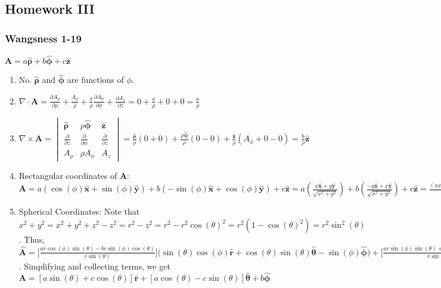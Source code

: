 \documentclass[oneside]{book}
\theoremstyle{definition}
\newcommand*\B[1]{\mathbf{#1}}
\newcommand*\Bh[1]{\mathbf{\hat{#1}}}
\begin{document}
\subsection*{Homework III}

\subsubsection{Wangsness 1-19}
$\B{A} = a\B{\hat{\rho}} + b\B{\hat{\phi}}+c\B{\hat{z}}$
\begin{enumerate}
\item No. $\Bh{\rho}$ and $\Bh{\phi}$ are functions of $\phi$.
\item $\nabla \cdot \B{A} = \frac{\partial A_{\rho}}{\partial \rho} + \frac{A_{\rho}}{\rho} + \frac{1}{\rho}\frac{\partial A_{\phi}}{\partial \phi} + \frac{\partial A_{z}}{\partial z} = 0+\frac{a}{\rho}+0+0 = \frac{a}{\rho}$
\item $\nabla \times \B{A} = \begin{vmatrix} \Bh{\rho} & \rho \Bh{\phi} & \Bh{z} \\ \frac{\partial}{\partial z} & \frac{\partial}{\partial \phi} & \frac{\partial}{\partial z} \\ A_{\rho} & \rho A_{\phi} & A_z \end{vmatrix} = \frac{\Bh{\rho}}{\rho}(0+0)+\frac{\rho \Bh{\phi}}{\rho}(0-0) + \frac{\Bh{z}}{\rho}(A_\phi +0-0) = \frac{b}{\rho}\Bh{z}$
\item Rectangular coordinates of $\B{A}$: $\B{A} = a(\cos(\phi)\Bh{x}+\sin(\phi)\Bh{y})+b(-\sin(\phi)\Bh{x}+\cos(\phi)\Bh{y})+c\Bh{z} = a(\frac{x\Bh{x}+y\Bh{y}}{\sqrt{x^2+y^2}})+b(\frac{-y\Bh{x}+x\Bh{y}}{\sqrt{x^2+y^2}})+c\Bh{z} = \frac{(ax-by)\Bh{x}+(ay+bx)\Bh{y}}{\sqrt{x^2+y^2}}+c\Bh{z}$
\item Spherical Coordinates: Note that $x^2+y^2 = x^2+y^2+z^2-z^2=r^2-z^2=r^2-r^2\cos(\theta)^2=r^2(1-\cos(\theta)^2)=r^2\sin^2(\theta)$. Thus, $\Bh{A} = \big[\frac{ar\cos(\phi)\sin(\theta)-br\sin(\phi)\cos(\theta)}{r\sin(\theta)}\big]\big(\sin(\theta)\cos(\phi)\Bh{r}+\cos(\theta)\sin(\theta)\Bh{\theta}-\sin(\phi)\Bh{\phi}\big) + \big[\frac{ar\sin(\phi)\sin(\theta)+br\cos(\phi)\sin(\theta)}{r\sin(\theta)}\big](\sin(\theta)\sin(\phi)\Bh{r}+\cos(\theta)\sin(\phi)\Bh{\theta}+\cos(\phi)\Bh{\phi}\big)+c[\cos(\theta)\Bh{r}-\sin(\theta)\Bh{\theta}]$. Simplifying and collecting terms, we get $\B{A} = [a\sin(\theta)+c\cos(\theta)]\Bh{r}+[a\cos(\theta)-c\sin(\theta)]\Bh{\theta}+b\Bh{\phi}$
\end{enumerate}
\end{document}
